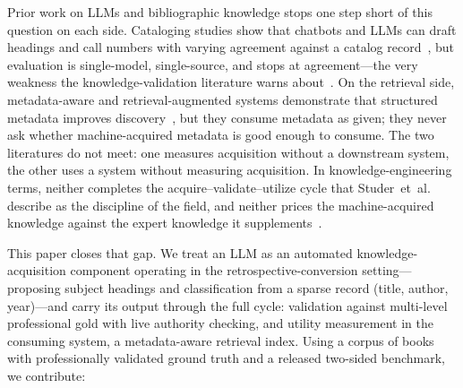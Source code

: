 Prior work on LLMs and bibliographic knowledge stops one step short of this
question on each side. Cataloging studies show that chatbots and LLMs can
draft headings and call numbers with varying agreement against a catalog
record~\cite{holstrom_llm_cataloging, characterising_ai_cataloguing,
ital_genai_cataloging, dobreski_chatbots_cataloging}, but evaluation is
single-model, single-source, and stops at agreement---the very weakness the
knowledge-validation literature warns
about~\cite{okeefe_kbs_validation}. On the retrieval side, metadata-aware
and retrieval-augmented systems demonstrate that structured metadata
improves discovery~\cite{bm25f, folkrag, bergen, lund_rag_libraries}, but
they consume metadata as given; they never ask whether machine-acquired
metadata is good enough to consume. The two literatures do not meet: one
measures acquisition without a downstream system, the other uses a system
without measuring acquisition. In knowledge-engineering terms, neither
completes the acquire--validate--utilize cycle that
Studer~et~al.~\cite{studer_knowledge_engineering} describe as the discipline
of the field, and neither prices the machine-acquired knowledge against the
expert knowledge it supplements~\cite{gruber_portable_ontologies}.

This paper closes that gap. We treat an LLM as an automated
knowledge-acquisition component operating in the retrospective-conversion
setting---proposing subject headings and classification from a sparse record
(title, author, year)---and carry its output through the full cycle:
validation against multi-level professional gold with live authority
checking, and utility measurement in the consuming system, a
metadata-aware retrieval index. Using a corpus of  books
with professionally validated ground truth and a released two-sided
benchmark, we contribute:

